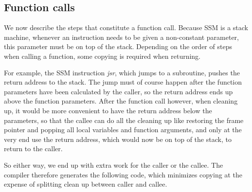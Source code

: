 \documentclass[a4paper]{article}
\begin{document}
\subsection{Function calls}

We now describe the steps that constitute a function call.  Because SSM is a
stack machine, whenever an instruction needs to be given a non-constant
parameter, this parameter must be on top of the stack.  Depending on the order
of steps when calling a function, some copying is required when
returning.

For example, the SSM instruction \emph{jsr}, which jumps to a subroutine, pushes
the return address to the stack.  The jump must of course happen after the
function parameters have been calculated by the caller, so the return address
ends up above the function parameters.  After the function call however, when
cleaning up, it would be more convenient to have the return address below the
parameters, so that the callee can do all the cleaning up like restoring the
frame pointer and popping all local variables and function arguments, and only
at the very end use the return address, which would now be on top of the stack,
to return to the caller.

So either way, we end up with extra work for the caller or the callee.  The
compiler therefore generates the following code, which minimizes copying at the
expense of splitting clean up between caller and callee.
\end{document}
